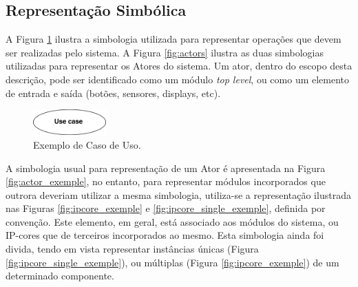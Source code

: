 \documentclass{article}
\begin{document}
  \subsection{Representação Simbólica}
  A Figura \ref{fig:uc_exemple} ilustra a simbologia utilizada para representar operações que devem ser realizadas pelo sistema. A Figura \ref{fig:actors} ilustra as duas simbologias utilizadas para representar os Atores do sistema. Um ator, dentro do escopo desta descrição, pode ser identificado como um módulo \textit{top level}, ou como um elemento de entrada e saída (botões, sensores, displays, etc).
  
  \FloatBarrier
  \begin{figure}[H]
    \centering
    \includegraphics[width=0.25\textwidth]{uc_exemple.png}
    \caption{Exemplo de Caso de Uso.}
    \label{fig:uc_exemple}
  \end{figure}  
  
  A simbologia usual para representação de um Ator é apresentada na Figura \ref{fig:actor_exemple}, no entanto, para representar módulos incorporados que outrora deveriam utilizar a mesma simbologia, utiliza-se a representação ilustrada nas Figuras \ref{fig:ipcore_exemple} e \ref{fig:ipcore_single_exemple}, definida por convenção. Este elemento, em geral, está associado aos módulos do sistema, ou IP-cores que de terceiros incorporados ao mesmo. Esta simbologia ainda foi divida, tendo em vista representar instâncias únicas (Figura \ref{fig:ipcore_single_exemple}), ou múltiplas (Figura \ref{fig:ipcore_exemple}) de um determinado componente. 
  
\end{document}
